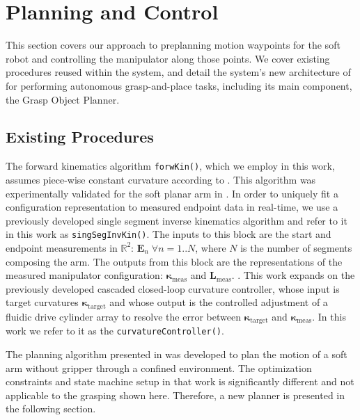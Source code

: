 \section{Planning and Control}
\label{sec:processing_and_control}
This section covers our approach to preplanning motion waypoints for the soft robot and controlling the manipulator along those points. We cover existing procedures reused within the system, and detail the system's new architecture of for performing autonomous grasp-and-place tasks, including its main component, the Grasp Object Planner.

\subsection{Existing Procedures}
The forward kinematics algorithm \texttt{forwKin()}, which we employ in this work, assumes piece-wise constant curvature according to \cite{webster2010design}. 
This algorithm was experimentally validated for the soft planar arm in \cite{marchese2014design}.
In order to uniquely fit a configuration representation to measured endpoint data in real-time, we use a previously developed single segment inverse kinematics algorithm \cite{marchese2014design} and refer to it in this work as \texttt{singSegInvKin()}.
The inputs to this block are the start and endpoint measurements in $\mathbb{R}^2$: $\mathbf{E}_n \; \forall n  = 1..N$, where $N$ is the number of segments composing the arm.
The outputs from this block are the representations of the measured manipulator configuration: $\boldsymbol{\kappa}_{\textrm{meas}}$ and $\mathbf{L}_{\textrm{meas}}$.
.
This work expands on the previously developed cascaded closed-loop curvature controller, whose input is target curvatures $\boldsymbol{\kappa}_{\textrm{target}}$ and whose output is the controlled adjustment of a fluidic drive cylinder array to resolve the error between $\boldsymbol{\kappa}_{\textrm{target}}$ and $\boldsymbol{\kappa}_{\textrm{meas}}$.
In this work we refer to it as the \texttt{curvatureController()}.

The planning algorithm presented in \cite{marchese2014whole} was developed to plan the motion of a soft arm  without gripper through a confined environment. 
The optimization constraints and state machine setup in that work is significantly different and not applicable to the grasping shown here. 
Therefore, a new planner is presented in the following section.

